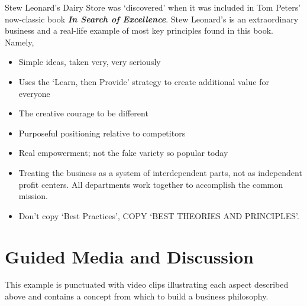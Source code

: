 \documentclass[
]{book}
\providecommand{\tightlist}{%
  \setlength{\itemsep}{0pt}\setlength{\parskip}{0pt}}
\begin{document}
Stew Leonard's Dairy Store was `discovered' when it was included in Tom Peters' now-classic book \textbf{\emph{In Search of Excellence}}. Stew Leonard's is an extraordinary business and a real-life example of most key principles found in this book. Namely,

\begin{itemize}
\tightlist
\item
  Simple ideas, taken very, very seriously
\item
  Uses the `Learn, then Provide' strategy to create additional value for everyone
\item
  The creative courage to be different
\item
  Purposeful positioning relative to competitors
\item
  Real empowerment; not the fake variety so popular today
\item
  Treating the business as a system of interdependent parts, not as independent profit centers. All departments work together to accomplish the common mission.
\item
  Don't copy `Best Practices', COPY `BEST THEORIES AND PRINCIPLES'.
\end{itemize}

\hypertarget{guided-media-and-discussion}{%
\section{Guided Media and Discussion}\label{guided-media-and-discussion}}

This example is punctuated with video clips illustrating each aspect described above and contains a concept from which to build a business philosophy.
\end{document}
